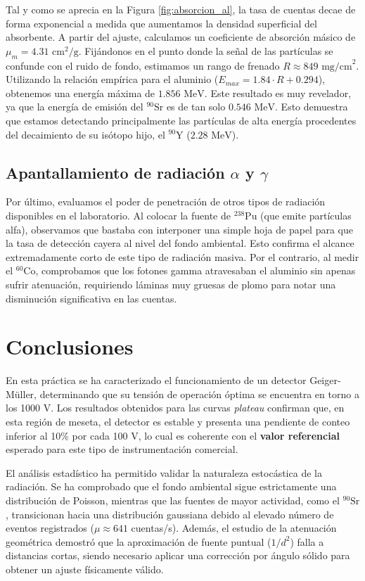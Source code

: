 \documentclass[9pt,a4paper,twocolumn,twoside]{rho-class/rho}
\begin{document}
Tal y como se aprecia en la Figura \ref{fig:absorcion_al}, la tasa de cuentas decae de forma exponencial a medida que aumentamos la densidad superficial del absorbente. A partir del ajuste, calculamos un coeficiente de absorción másico de $\mu_m = 4.31 \text{ cm}^2/\text{g}$. 
Fijándonos en el punto donde la señal de las partículas se confunde con el ruido de fondo, estimamos un rango de frenado $R \approx 849 \text{ mg/cm}^2$. Utilizando la relación empírica para el aluminio ($E_{max} = 1.84 \cdot R + 0.294$), obtenemos una energía máxima de $1.856 \text{ MeV}$. Este resultado es muy revelador, ya que la energía de emisión del $^{90}\text{Sr}$ es de tan solo $0.546 \text{ MeV}$. Esto demuestra que estamos detectando principalmente las partículas de alta energía procedentes del decaimiento de su isótopo hijo, el $^{90}\text{Y}$ ($2.28 \text{ MeV}$).

\subsection{Apantallamiento de radiación \texorpdfstring{$\alpha$ y $\gamma$}{alfa y gamma}}

Por último, evaluamos el poder de penetración de otros tipos de radiación disponibles en el laboratorio. Al colocar la fuente de $^{238}\text{Pu}$ (que emite partículas alfa), observamos que bastaba con interponer una simple hoja de papel para que la tasa de detección cayera al nivel del fondo ambiental. Esto confirma el alcance extremadamente corto de este tipo de radiación masiva. 
Por el contrario, al medir el $^{60}\text{Co}$, comprobamos que los fotones gamma atravesaban el aluminio sin apenas sufrir atenuación, requiriendo láminas muy gruesas de plomo para notar una disminución significativa en las cuentas.

\section{Conclusiones}

En esta práctica se ha caracterizado el funcionamiento de un detector Geiger-Müller, determinando que su tensión de operación óptima se encuentra en torno a los 1000 V. Los resultados obtenidos para las curvas \textit{plateau} confirman que, en esta región de meseta, el detector es estable y presenta una pendiente de conteo inferior al 10\% por cada 100 V, lo cual es coherente con el \textbf{valor referencial} esperado para este tipo de instrumentación comercial.

El análisis estadístico ha permitido validar la naturaleza estocástica de la radiación. Se ha comprobado que el fondo ambiental sigue estrictamente una distribución de Poisson, mientras que las fuentes de mayor actividad, como el $^{90}\text{Sr}$, transicionan hacia una distribución gaussiana debido al elevado número de eventos registrados ($\mu \approx 641$ cuentas/s). Además, el estudio de la atenuación geométrica demostró que la aproximación de fuente puntual ($1/d^2$) falla a distancias cortas, siendo necesario aplicar una corrección por ángulo sólido para obtener un ajuste físicamente válido.
\end{document}

